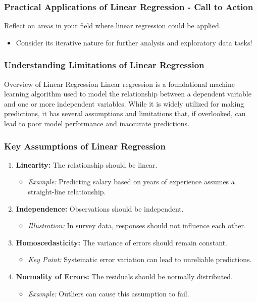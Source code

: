 \documentclass[aspectratio=169]{beamer}
\begin{document}
\begin{frame}[fragile]
    \frametitle{Practical Applications of Linear Regression - Call to Action}
    Reflect on areas in your field where linear regression could be applied. 
    \begin{itemize}
        \item Consider its iterative nature for further analysis and exploratory data tasks!
    \end{itemize}
\end{frame}

\begin{frame}[fragile]
    \frametitle{Understanding Limitations of Linear Regression}
    \begin{block}{Overview of Linear Regression}
        Linear regression is a foundational machine learning algorithm used to model the relationship between a dependent variable and one or more independent variables. While it is widely utilized for making predictions, it has several assumptions and limitations that, if overlooked, can lead to poor model performance and inaccurate predictions.
    \end{block}
\end{frame}

\begin{frame}[fragile]
    \frametitle{Key Assumptions of Linear Regression}
    \begin{enumerate}
        \item \textbf{Linearity:} The relationship should be linear.
        \begin{itemize}
            \item \textit{Example:} Predicting salary based on years of experience assumes a straight-line relationship.
        \end{itemize}
        
        \item \textbf{Independence:} Observations should be independent.
        \begin{itemize}
            \item \textit{Illustration:} In survey data, responses should not influence each other.
        \end{itemize}
        
        \item \textbf{Homoscedasticity:} The variance of errors should remain constant.
        \begin{itemize}
            \item \textit{Key Point:} Systematic error variation can lead to unreliable predictions.
        \end{itemize}
        
        \item \textbf{Normality of Errors:} The residuals should be normally distributed.
        \begin{itemize}
            \item \textit{Example:} Outliers can cause this assumption to fail.
        \end{itemize}
    \end{enumerate}
\end{frame}
\end{document}
